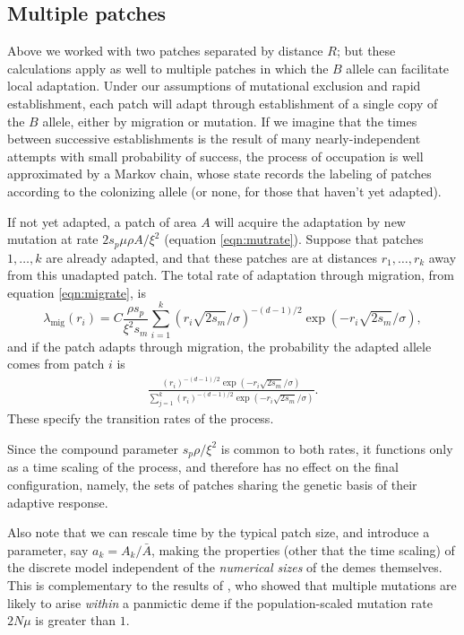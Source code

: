\documentclass{article}
\newcommand{\migrate}{\lambda_\text{mig}}
\begin{document}
\subsection{Multiple patches}
Above we worked with two patches separated by distance $R$;
but these calculations apply as well to multiple patches
in which the $B$ allele can facilitate local adaptation. 
Under our assumptions of mutational exclusion and rapid establishment, 
each patch will adapt through establishment of a single copy of the $B$ allele, 
either by migration or mutation.
If we imagine that the times between successive establishments is the result of many nearly-independent attempts
with small probability of success,
the process of occupation is well approximated by a Markov chain,
whose state records the labeling of patches according to the colonizing allele
(or none, for those that haven't yet adapted).

If not yet adapted, a patch of area $A$ will acquire the adaptation by new mutation at rate $2 s_p \mu \rho A/\xi^2$ (equation \eqref{eqn:mutrate}).
Suppose that patches $1, \ldots, k$ are already adapted,
and that these patches are at distances $r_1, \ldots, r_k$ away from this unadapted patch.
The total rate of adaptation through migration, from equation \eqref{eqn:migrate}, is
\begin{equation}
  \migrate(r_i) = C \frac{ \rho s_p }{\xi^2 s_m} \sum_{i=1}^{k} \left(r_i \sqrt{2 s_m} /\sigma \right)^{-(d-1)/2} \exp\left(- r_i \sqrt{2 s_m} /\sigma\right),
\end{equation}
and if the patch adapts through migration, the probability the adapted allele 
comes from patch $i$ is 
\begin{align}  \label{eqn:prob-parallel}
  \frac{\left(r_i \right)^{-(d-1)/2} \exp\left(- r_i \sqrt{2 s_m}
  /\sigma\right)} {\sum_{j=1}^{k}  \left(r_i \right)^{-(d-1)/2} \exp\left(- r_i \sqrt{2 s_m}
    /\sigma\right) } .
\end{align}
These specify the transition rates of the process.

Since the compound parameter $s_p \rho / \xi^2$ is common to both rates,
it functions only as a time scaling of the process, 
and therefore has no effect on the final configuration, namely, 
the sets of patches sharing the genetic basis of their adaptive response.

Also note that we can rescale time by the typical patch size, and introduce a parameter, say $a_k = A_k/\bar A$,
making the properties (other that the time scaling) of the discrete model independent of the \emph{numerical sizes} of the demes themselves.
This is complementary to the results of \cite{softsweepsII}, who showed that multiple mutations are likely to arise \emph{within} a panmictic deme
if the population-scaled mutation rate $2 N \mu$ is greater than $1$.
\end{document}
